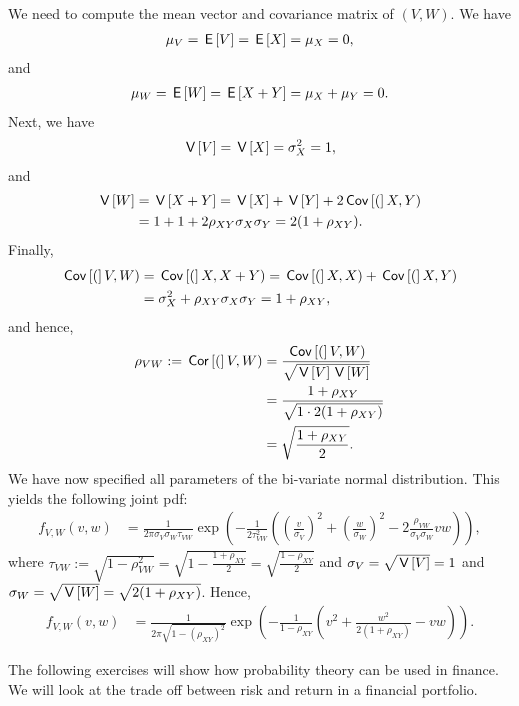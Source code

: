 \documentclass[lectures]{subfiles}
\begin{document}
\begin{exercise}
\begin{solution}
We need to compute the mean vector and covariance matrix of $(V,W)$. We have
\begin{align}
    \mu_V = \,\mathsf{E}\left[V\right] = \,\mathsf{E}\left[X\right] = \mu_X = 0,
\end{align}
and
\begin{align}
    \mu_W = \,\mathsf{E}\left[W\right] = \,\mathsf{E}\left[X + Y\right] = \mu_X + \mu_Y = 0.
\end{align}
Next, we have
\begin{align}
    \,\mathsf{V}\left[V\right] = \,\mathsf{V}\left[X\right] = \sigma_X^2 = 1,
\end{align}
and
\begin{align}
    \,\mathsf{V}\left[W\right] &= \,\mathsf{V}\left[X + Y\right] = \,\mathsf{V}\left[X\right] + \,\mathsf{V}\left[Y\right] + 2\,\mathsf{Cov}\left[(\right]X,Y)\\
    &= 1 + 1 + 2 \rho_{XY} \sigma_X \sigma_Y = 2(1 + \rho_{XY}).
\end{align}
Finally,
\begin{align}
    \,\mathsf{Cov}\left[(\right]V,W) &= \,\mathsf{Cov}\left[(\right]X, X + Y) = \,\mathsf{Cov}\left[(\right]X, X) + \,\mathsf{Cov}\left[(\right]X, Y) \\
    &= \sigma_X^2 + \rho_{XY} \sigma_X \sigma_Y = 1 + \rho_{XY},
\end{align}
and hence,
\begin{align}
    \rho_{VW} := \,\mathsf{Cor}\left[(\right]V,W) &= \frac{\,\mathsf{Cov}\left[(\right]V,W)}{\sqrt{\,\mathsf{V}\left[V\right]\,\mathsf{V}\left[W\right]}} \\
    &= \frac{1 + \rho_{XY}}{\sqrt{1 \cdot 2(1 + \rho_{XY})}} \\
    &= \sqrt{\frac{1 + \rho_{XY}}{2}}.
\end{align}
We have now specified all parameters of the bi-variate normal distribution. This yields the following joint pdf:
\begin{align}
    f_{V,W}(v,w) &= \frac{1}{2\pi \sigma_V \sigma_W \tau_{VW}} \exp\left(-\frac{1}{2 \tau_{VW}^2}\left(\left(\frac{v}{\sigma_V}\right)^2 + \left(\frac{w}{\sigma_W}\right)^2 - 2 \frac{\rho_{VW}}{\sigma_V \sigma_W} vw\right) \right),
\end{align}
where $\tau_{VW} := \sqrt{1 - \rho_{VW}^2} = \sqrt{1 - \frac{1 + \rho_{XY}}{2}} = \sqrt{\frac{1 - \rho_{XY}}{2}}$ and $\sigma_V = \sqrt{\,\mathsf{V}\left[V\right]} = 1$ and $\sigma_W = \sqrt{\,\mathsf{V}\left[W\right]} = \sqrt{2(1 + \rho_{XY})}$. Hence,
\begin{align}
    f_{V,W}(v,w) &= \frac{1}{2\pi \sqrt{1 - (\rho_{XY})^2}} \exp\left(-\frac{1}{1 - \rho_{XY}}\left(v^2 + \frac{w^2}{2(1 + \rho_{XY})}-vw\right)\right).
\end{align}

\end{solution}
\end{exercise}


The following exercises will show how probability theory can be used in finance. We will look at the trade off between risk and return in a financial portfolio.
\end{document}
